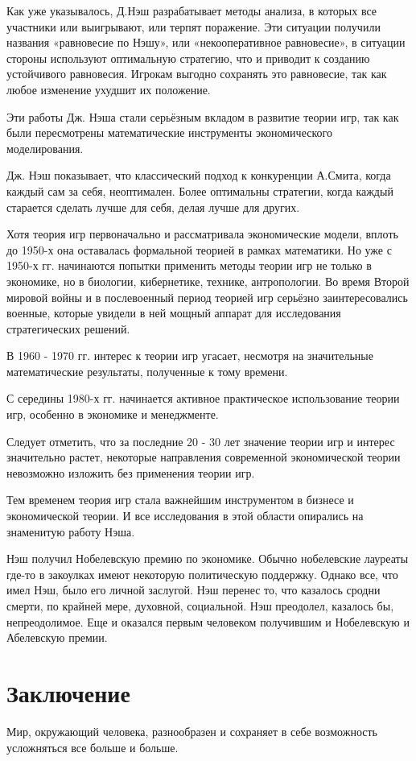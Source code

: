 \documentclass[14pt, a4paper]{extarticle}
\let\stdsection\section
\renewcommand\section{\newpage\stdsection}
\begin{document}
Как уже указывалось, Д.Нэш разрабатывает методы анализа, в которых все
участники или выигрывают, или терпят поражение. Эти ситуации получили названия
«равновесие по Нэшу», или «некооперативное равновесие», в ситуации стороны
используют оптимальную стратегию, что и приводит к созданию устойчивого
равновесия. Игрокам выгодно сохранять это равновесие, так как любое изменение
ухудшит их положение.

Эти работы Дж. Нэша стали серьёзным вкладом в развитие теории игр, так как
были пересмотрены математические инструменты экономического моделирования.

Дж. Нэш показывает, что классический подход к конкуренции А.Смита, когда
каждый сам за себя, неоптимален. Более оптимальны стратегии, когда каждый
старается сделать лучше для себя, делая лучше для других.

Хотя теория игр первоначально и рассматривала экономические модели, вплоть
до 1950-х она оставалась формальной теорией в рамках математики. Но уже с
1950-х гг. начинаются попытки применить методы теории игр не только в
экономике, но в биологии, кибернетике, технике, антропологии. Во время
Второй мировой войны и в послевоенный период теорией игр серьёзно
заинтересовались военные, которые увидели в ней мощный аппарат для
исследования стратегических решений.

В 1960 - 1970 гг. интерес к теории игр угасает, несмотря на значительные
математические результаты, полученные к тому времени.

С середины 1980-х гг. начинается активное практическое использование теории
игр, особенно в экономике и менеджменте.

Следует отметить, что за последние 20 - 30 лет значение теории игр и
интерес значительно растет, некоторые направления современной экономической
теории невозможно изложить без применения теории игр.

Тем временем теория игр стала важнейшим инструментом в бизнесе и
экономической теории. И все исследования в этой области опирались на
знаменитую работу Нэша.

Нэш получил Нобелевскую премию по экономике. Обычно нобелевские лауреаты
где-то в закоулках имеют некоторую политическую поддержку. Однако все,
что имел Нэш, было его личной заслугой. Нэш перенес то, что казалось
сродни смерти, по крайней мере, духовной, социальной. Нэш преодолел,
казалось бы, непреодолимое. Еще и оказался первым человеком получившим и
Нобелевскую и Абелевскую премии.

\section{Заключение}
Мир, окружающий человека, разнообразен и сохраняет в себе возможность
усложняться все больше и больше.
\end{document}
